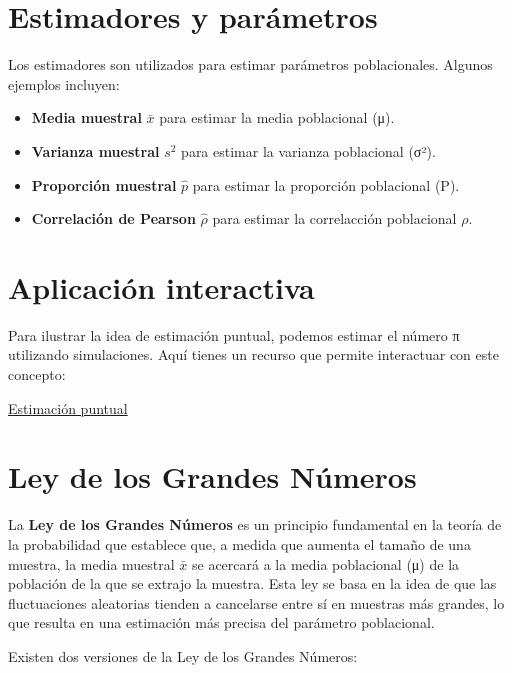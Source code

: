 \documentclass[
  letterpaper,
  DIV=11,
  numbers=noendperiod]{scrreprt}
\providecommand{\tightlist}{%
  \setlength{\itemsep}{0pt}\setlength{\parskip}{0pt}}\usepackage{longtable,booktabs,array}
\begin{document}
\section{Estimadores y parámetros}\label{estimadores-y-paruxe1metros}

Los estimadores son utilizados para estimar parámetros poblacionales.
Algunos ejemplos incluyen:

\begin{itemize}
\tightlist
\item
  \textbf{Media muestral} \(\bar{x}\) para estimar la media poblacional
  (μ).
\item
  \textbf{Varianza muestral} \(s^2\) para estimar la varianza
  poblacional (σ²).
\item
  \textbf{Proporción muestral} \(\hat{p}\) para estimar la proporción
  poblacional (P).
\item
  \textbf{Correlación de Pearson} \(\hat{\rho}\) para estimar la
  correlacción poblacional \(\rho\).
\end{itemize}

\section{Aplicación interactiva}\label{aplicaciuxf3n-interactiva}

Para ilustrar la idea de estimación puntual, podemos estimar el número π
utilizando simulaciones. Aquí tienes un recurso que permite interactuar
con este concepto:

\href{https://seeing-theory.brown.edu/frequentist-inference/}{Estimación
puntual}

\section{Ley de los Grandes
Números}\label{ley-de-los-grandes-nuxfameros}

La \textbf{Ley de los Grandes Números} es un principio fundamental en la
teoría de la probabilidad que establece que, a medida que aumenta el
tamaño de una muestra, la media muestral \(\bar{x}\) se acercará a la
media poblacional (μ) de la población de la que se extrajo la muestra.
Esta ley se basa en la idea de que las fluctuaciones aleatorias tienden
a cancelarse entre sí en muestras más grandes, lo que resulta en una
estimación más precisa del parámetro poblacional.

Existen dos versiones de la Ley de los Grandes Números:
\end{document}
